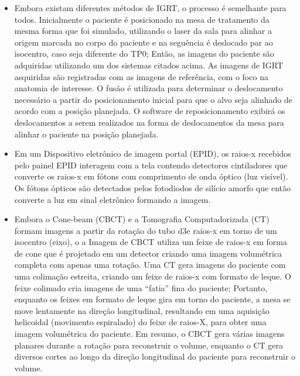 \documentclass[11pt,a4paper]{article}
\newcounter{exemplo}
\begin{document}
\begin{exemplo}[IGRT]
\begin{itemize}
        \item Embora existam diferentes métodos de IGRT, o processo é semelhante para todos. Inicialmente o paciente é posicionado na mesa de tratamento da mesma forma que foi simulado, utilizando o laser da sala para alinhar a origem marcada no corpo do paciente e na seguência é deslocado par ao isocentro, caso seja diferente do TP0; Então, as imagens do paciente são adquiridas utilizando um dos sistemas citados acima. As imagens de IGRT asquiridas são registradas com as imagens de referência, com o foco na anatomia de interesse. O fusão é utilizada para determinar o deslocamento necessário a partir do posicionamento inicial para que o alvo seja alinhado de acordo com a posição planejada. O software de reposicionamento exibirá os deslocamentos a serem realizados na forma de deslocamentos da mesa para alinhar o paciente na posição planejada.
        
        \item Em um Dispositivo eletrônico de imagem portal (EPID), os raios-x recebidos pelo painel EPID interagem com a tela contendo detectores cintiladores que converte os raios-x em fótons com comprimento de onda óptico (luz visível). Os fótons ópticos são detectados pelos fotodiodos de silício amorfo que então converte a luz em sinal eletrônico formando a imagem.
        
        \item Embora o Cone-beam (CBCT) e a Tomografia Computadorizada (CT) formam imagens a partir da rotação do tubo d3e raios-x em torno de um isocentro (eixo), o a Imagem de CBCT utiliza um feixe de raios-x em forma de cone que é projetado em um detector criando uma imagem volumétrica completa com apenas uma rotação. Uma CT gera imagens do paciente com uma colimação estreita, criando um feixe de raios-x com formato de leque. O feixe colimado cria imagens de uma ``fatia'' fina do paciente; Portanto, enquanto os feixes em formato de leque gira em torno do paciente, a mesa se move lentamente na direção longitudinal, resultando em uma aquisição helicoidal (movimento espiralado) do feixe de raios-X, para obter uma imagem volumétrica do paciente. Em resumo, o CBCT gera várias imagens planares durante a rotação para reconstruir o volume, enquanto o CT gera diversos cortes ao longo da direção longitudinal do paciente para reconstruir o volume.
        

\end{itemize}
\end{exemplo}
\end{document}
